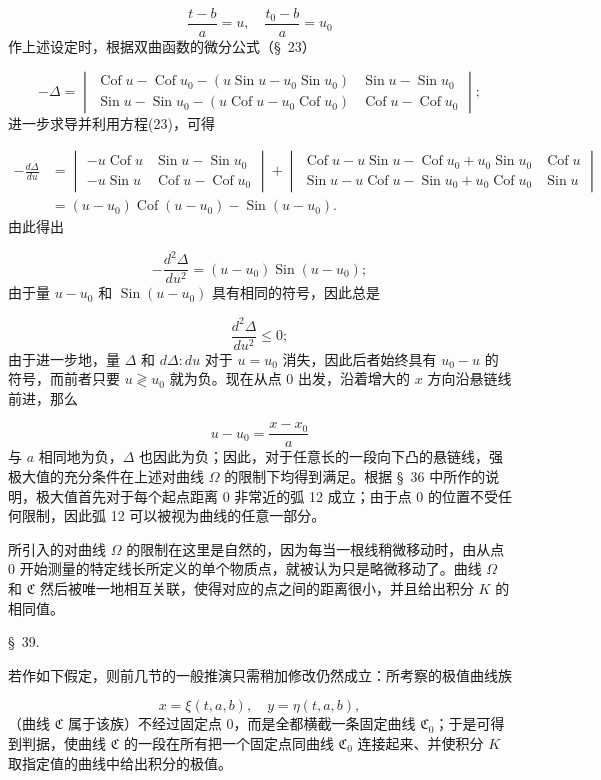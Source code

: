 \documentclass[11pt,a4paper,leqno]{article}
\newcommand{\Cof}{\operatorname{Cof}}
\newcommand{\Sin}{\operatorname{Sin}}
\begin{document}
\[
\frac{t-b}{a}=u,
\quad
\frac{t_0-b}{a}=u_0
\]
作上述设定时，根据双曲函数的微分公式（\S~23）

\[
-\Delta=\begin{vmatrix}
\Cof u-\Cof u_0-(u\Sin u-u_0\Sin u_0)&\Sin u-\Sin u_0\\
\Sin u-\Sin u_0-(u\Cof u-u_0\Cof u_0)&\Cof u-\Cof u_0
\end{vmatrix};
\]
进一步求导并利用方程(23)，可得

\[
\begin{aligned}
-\frac{d\Delta}{du}&=\begin{vmatrix}
-u\Cof u&\Sin u-\Sin u_0\\
-u\Sin u&\Cof u-\Cof u_0
\end{vmatrix}
+\begin{vmatrix}
\Cof u-u\Sin u-\Cof u_0+u_0\Sin u_0&\Cof u\\
\Sin u-u\Cof u-\Sin u_0+u_0\Cof u_0&\Sin u
\end{vmatrix}\\
&=(u-u_0)\Cof(u-u_0)-\Sin(u-u_0).
\end{aligned}
\]
由此得出

\[
-\frac{d^2\Delta}{du^2}=(u-u_0)\Sin(u-u_0);
\]
由于量 $u-u_0$ 和 $\Sin(u-u_0)$ 具有相同的符号，因此总是

\[
\frac{d^2\Delta}{du^2}\leq0;
\]
由于进一步地，量 $\Delta$ 和 $d\Delta:du$ 对于 $u=u_0$ 消失，因此后者始终具有 $u_0-u$ 的符号，而前者只要 $u\gtrless u_0$ 就为负。现在从点 0 出发，沿着增大的 $x$ 方向沿悬链线前进，那么

\[
u-u_0=\frac{x-x_0}{a}
\]
与 $a$ 相同地为负，$\Delta$ 也因此为负；因此，对于任意长的一段向下凸的悬链线，强极大值的充分条件在上述对曲线 $\Omega$ 的限制下均得到满足。根据 \S~36 中所作的说明，极大值首先对于每个起点距离 0 非常近的弧 12 成立；由于点 0 的位置不受任何限制，因此弧 12 可以被视为曲线的任意一部分。

所引入的对曲线 $\Omega$ 的限制在这里是自然的，因为每当一根线稍微移动时，由从点 0 开始测量的特定线长所定义的单个物质点，就被认为只是略微移动了。曲线 $\Omega$ 和 $\mathfrak{C}$ 然后被唯一地相互关联，使得对应的点之间的距离很小，并且给出积分 $K$ 的相同值。

\begin{center}
{\large \S~39.}
\end{center}
若作如下假定，则前几节的一般推演只需稍加修改仍然成立：所考察的极值曲线族

\begin{equation}\tag{24}
x=\xi(t,a,b),\quad y=\eta(t,a,b),
\end{equation}
（曲线 $\mathfrak{C}$ 属于该族）不经过固定点 0，而是全都横截一条固定曲线 $\mathfrak{C}_0$；于是可得到判据，使曲线 $\mathfrak{C}$ 的一段在所有把一个固定点同曲线 $\mathfrak{C}_0$ 连接起来、并使积分 $K$ 取指定值的曲线中给出积分的极值。
\end{document}
